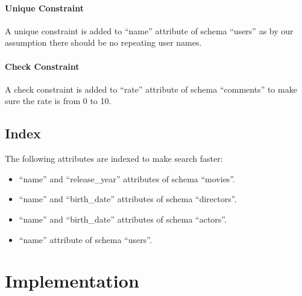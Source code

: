 \begin{CJK*}{UTF8}{gbsn}
\paragraph{Unique Constraint}
A unique constraint is added to ``name'' attribute of schema ``users'' as by our assumption there should be no repeating user names. 
\paragraph{Check Constraint}
A check constraint is added to ``rate'' attribute of schema ``comments'' to make sure the rate is from 0 to 10.

\subsection{Index}
The following attributes are indexed to make search faster:
\begin{itemize}
\item ``name'' and ``release\_year'' attributes of schema ``movies''.
\item ``name'' and ``birth\_date'' attributes of schema ``directors''.
\item ``name'' and ``birth\_date'' attributes of schema ``actors''.
\item ``name'' attribute of schema ``users''.
\end{itemize}

\section{Implementation}

\end{CJK*}
